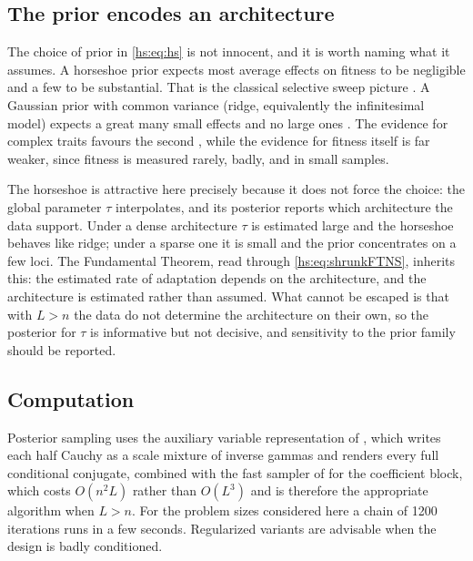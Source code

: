\subsection{The prior encodes an architecture}

The choice of prior in \eqref{hs:eq:hs} is not innocent, and it is worth naming what it assumes. A horseshoe prior expects most average effects on fitness to be negligible and a few to be substantial. That is the classical selective sweep picture \citep{hs:smith1974hitch}. A Gaussian prior with common variance (ridge, equivalently the infinitesimal model) expects a great many small effects and no large ones \citep{hs:fisher1918correlation,hs:barton2017infinitesimal}. The evidence for complex traits favours the second \citep{hs:hill2008data,hs:pritchard2010adaptation}, while the evidence for fitness itself is far weaker, since fitness is measured rarely, badly, and in small samples.

The horseshoe is attractive here precisely because it does not force the choice: the global parameter $\tau$ interpolates, and its posterior reports which architecture the data support. Under a dense architecture $\tau$ is estimated large and the horseshoe behaves like ridge; under a sparse one it is small and the prior concentrates on a few loci. The Fundamental Theorem, read through \eqref{hs:eq:shrunkFTNS}, inherits this: the estimated rate of adaptation depends on the architecture, and the architecture is estimated rather than assumed. What cannot be escaped is that with $L > n$ the data do not determine the architecture on their own, so the posterior for $\tau$ is informative but not decisive, and sensitivity to the prior family should be reported.

\subsection{Computation}

Posterior sampling uses the auxiliary variable representation of \citet{hs:makalic2016simple}, which writes each half Cauchy as a scale mixture of inverse gammas and renders every full conditional conjugate, combined with the fast sampler of \citet{hs:bhattacharya2016fast} for the coefficient block, which costs $O(n^2 L)$ rather than $O(L^3)$ and is therefore the appropriate algorithm when $L > n$. For the problem sizes considered here a chain of 1200 iterations runs in a few seconds. Regularized variants \citep{hs:piironen2017sparsity} are advisable when the design is badly conditioned.

